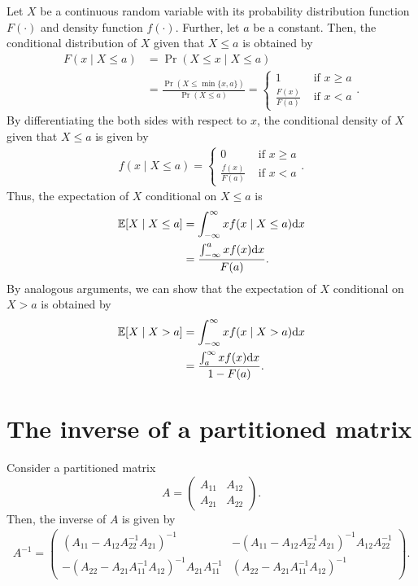 \documentclass[11pt, A4paper, openany, uplatex]{book}
\begin{document}
\begin{appendices}
Let $X$ be a continuous random variable with its probability distribution function $F(\cdot)$ and density function $f(\cdot)$.
Further, let $a$ be a constant.
Then, the conditional distribution of $X$ given that $X \leq a$ is obtained by
\begin{align*}
F(x \mid X \leq a)
& = \Pr(X \leq x \mid X \leq a)\\
& = \frac{\Pr(X \leq \min\{x, a\})}{\Pr(X \leq a)} = \left\{\begin{array}{cl}
1 & \text{ if $x \geq a$} \\ 
\frac{F(x)}{F(a)} & \text{ if $x < a$}
\end{array}	\right. .
\end{align*}
By differentiating the both sides with respect to $x$, the conditional density of $X$ given that $X \leq a$ is given by
\begin{align*}
f(x \mid X \leq a) = \left\{\begin{array}{cl}
0 & \text{ if $x \geq a$} \\ 
\frac{f(x)}{F(a)} & \text{ if $x < a$}
\end{array}	\right. .
\end{align*}
Thus, the expectation of $X$ conditional on $X \leq a$ is
\begin{align*}
\mathbb{E}[X \mid X \leq a] 
& = \int_{-\infty}^{\infty} x f(x \mid X \leq a) \mathrm{d}x \\
& = \frac{\int_{-\infty}^a x f(x) \mathrm{d}x}{F(a)}.
\end{align*}
By analogous arguments, we can show that the expectation of $X$ conditional on $X > a$ is obtained by
\begin{align*}
\mathbb{E}[X \mid X > a] 
& = \int_{-\infty}^{\infty} x f(x \mid X > a) \mathrm{d}x \\
& = \frac{\int_a^\infty x f(x) \mathrm{d}x}{1 - F(a)}.
\end{align*}

\section{The inverse of a partitioned matrix}
Consider a partitioned matrix
\[
	A = \left(\begin{array}{cc}
	A_{11} & A_{12} \\
	A_{21} & A_{22}
\end{array}	\right).
\]
Then, the inverse of $A$ is given by
\begin{align}\label{eq:inverse}
	A^{-1} = \left(\begin{array}{cc}
	(A_{11} - A_{12}A_{22}^{-1}A_{21})^{-1} & -(A_{11} - A_{12}A_{22}^{-1}A_{21})^{-1}A_{12}A_{22}^{-1} \\
	-(A_{22} - A_{21}A_{11}^{-1}A_{12})^{-1}A_{21}A_{11}^{-1} & (A_{22} - A_{21}A_{11}^{-1}A_{12})^{-1}
\end{array} \right).
\end{align}
\end{appendices}
\end{document}
